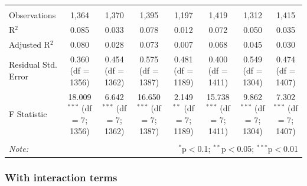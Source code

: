 \documentclass[
]{article}
\begin{document}
\begin{table}[!htbp]
\begin{tabular}{@{\extracolsep{5pt}}lccccccc}
 \hline \\[-1.8ex] 
Observations & 1,364 & 1,370 & 1,395 & 1,197 & 1,419 & 1,312 & 1,415 \\ 
R$^{2}$ & 0.085 & 0.033 & 0.078 & 0.012 & 0.072 & 0.050 & 0.035 \\ 
Adjusted R$^{2}$ & 0.080 & 0.028 & 0.073 & 0.007 & 0.068 & 0.045 & 0.030 \\ 
Residual Std. Error & 0.360 (df = 1356) & 0.454 (df = 1362) & 0.575 (df = 1387) & 0.481 (df = 1189) & 0.400 (df = 1411) & 0.549 (df = 1304) & 0.474 (df = 1407) \\ 
F Statistic & 18.009$^{***}$ (df = 7; 1356) & 6.642$^{***}$ (df = 7; 1362) & 16.650$^{***}$ (df = 7; 1387) & 2.149$^{**}$ (df = 7; 1189) & 15.738$^{***}$ (df = 7; 1411) & 9.862$^{***}$ (df = 7; 1304) & 7.302$^{***}$ (df = 7; 1407) \\ 
\hline 
\hline \\[-1.8ex] 
\textit{Note:}  & \multicolumn{7}{r}{$^{*}$p$<$0.1; $^{**}$p$<$0.05; $^{***}$p$<$0.01} \\ 
\end{tabular} 
\end{table}

\hypertarget{with-interaction-terms}{%
\subsubsection{With interaction terms}\label{with-interaction-terms}}
\end{document}

